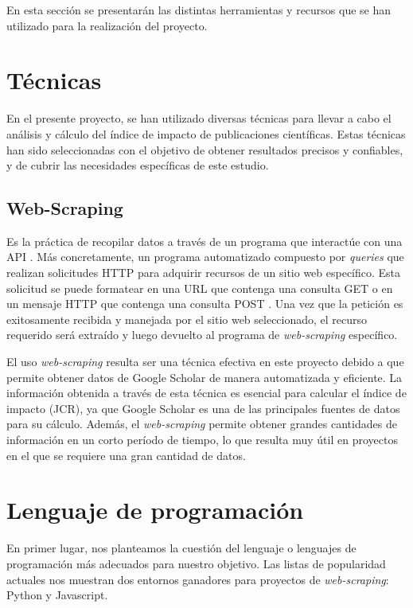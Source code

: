 
En esta sección se presentarán las distintas herramientas y recursos que se han utilizado para la realización del proyecto. 


\section{Técnicas}
En el presente proyecto, se han utilizado diversas técnicas para llevar a cabo el análisis y cálculo del índice de impacto de publicaciones científicas. Estas técnicas han sido seleccionadas con el objetivo de obtener resultados precisos y confiables, y de cubrir las necesidades específicas de este estudio.

\subsection{Web-Scraping}
Es la práctica de recopilar datos a través de un programa que interactúe con una API \cite{mitchell2018}. Más concretamente, un programa automatizado compuesto por \textit{queries} que realizan solicitudes HTTP para adquirir recursos de un sitio web específico. Esta solicitud se puede formatear en una URL que contenga una consulta GET o en un mensaje HTTP que contenga una consulta POST \cite{zhao2017}. Una vez que la petición es exitosamente recibida y manejada por el sitio web seleccionado, el recurso requerido será extraído y luego devuelto al programa de \textit{web-scraping} específico.

El uso \textit{web-scraping} resulta ser una técnica efectiva en este proyecto debido a que permite obtener datos de Google Scholar de manera automatizada y eficiente. La información obtenida a través de esta técnica es esencial para calcular el índice de impacto (JCR), ya que Google Scholar es una de las principales fuentes de datos para su cálculo. Además, el \textit{web-scraping} permite obtener grandes cantidades de información en un corto período de tiempo, lo que resulta muy útil en proyectos en el que se requiere una gran cantidad de datos.


\section{Lenguaje de programación}
En primer lugar, nos planteamos la cuestión del lenguaje o lenguajes de programación más adecuados para nuestro objetivo. Las listas de popularidad actuales nos muestran dos entornos ganadores para proyectos de \textit{web-scraping}: Python y Javascript.

